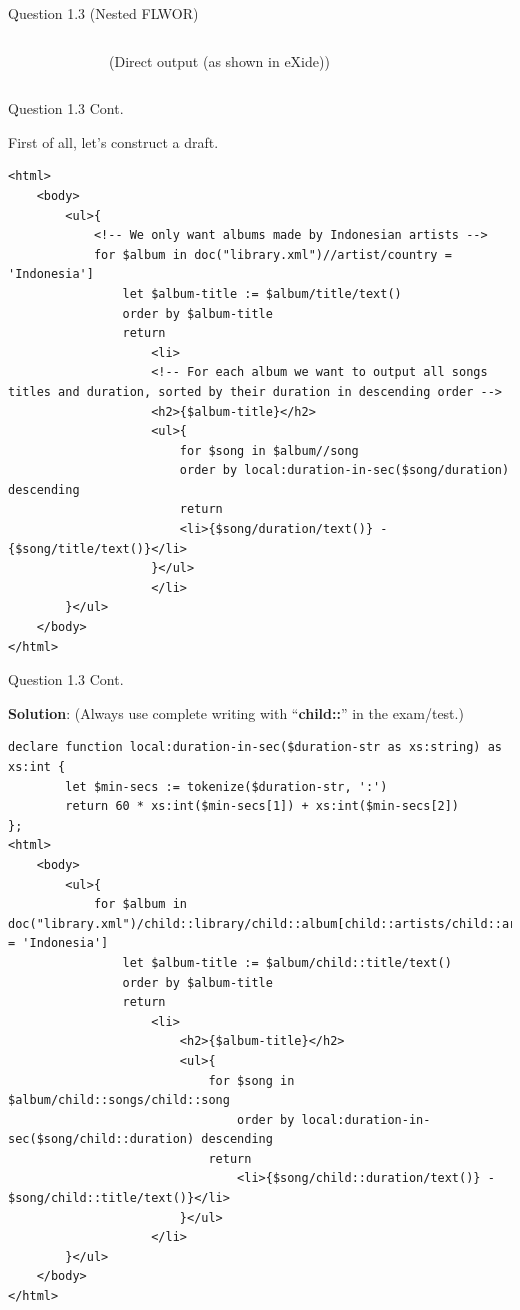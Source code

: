 \begin{frame}[fragile]{Question 1.3 (Nested FLWOR)}
\begin{columns}
\begin{figure}
\end{figure}\vspace{-5pt}
(Direct output (as shown in eXide))
\end{columns}
\end{frame}

\begin{frame}[fragile]{Question 1.3 Cont.}

First of all, let's construct a draft. \\
\begin{lstlisting}[style=xml-small]
<html>
	<body>
		<ul>{
			<!-- We only want albums made by Indonesian artists -->
			for $album in doc("library.xml")//artist/country = 'Indonesia']
				let $album-title := $album/title/text()
				order by $album-title
				return
					<li>
					<!-- For each album we want to output all songs titles and duration, sorted by their duration in descending order -->
					<h2>{$album-title}</h2>
					<ul>{
						for $song in $album//song
						order by local:duration-in-sec($song/duration) descending
						return
						<li>{$song/duration/text()} - {$song/title/text()}</li>
					}</ul>
					</li>
		}</ul>
	</body>
</html>
\end{lstlisting}


\end{frame}

\begin{frame}[fragile]{Question 1.3 Cont.}
	
\textbf{Solution}: (Always use complete writing with ``\textbf{child::}'' in the exam/test.)\\
\begin{lstlisting}[style=xml-small-nomargin]
declare function local:duration-in-sec($duration-str as xs:string) as xs:int {
		let $min-secs := tokenize($duration-str, ':')
		return 60 * xs:int($min-secs[1]) + xs:int($min-secs[2])
};
<html>
	<body>
		<ul>{
			for $album in doc("library.xml")/child::library/child::album[child::artists/child::artist/child::country = 'Indonesia']
				let $album-title := $album/child::title/text()
				order by $album-title
				return
					<li>
						<h2>{$album-title}</h2>
						<ul>{
							for $song in $album/child::songs/child::song
								order by local:duration-in-sec($song/child::duration) descending
							return
								<li>{$song/child::duration/text()} - $song/child::title/text()}</li>
						}</ul>
					</li>
		}</ul>
	</body>
</html>
\end{lstlisting}
	
	
\end{frame}


